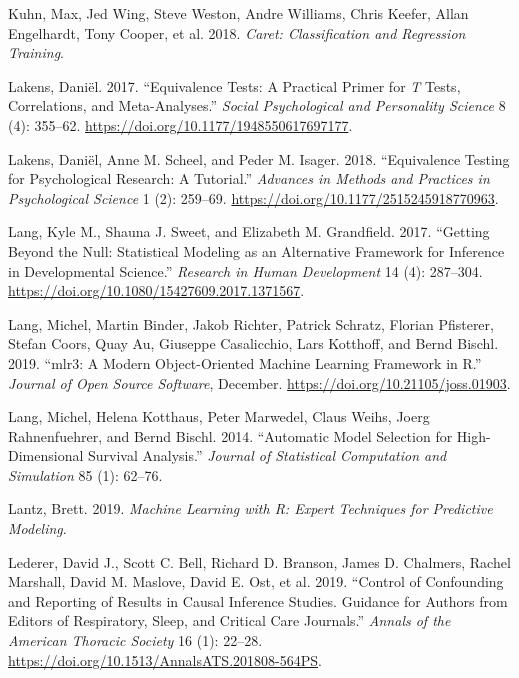 \documentclass[
]{book}
\newlength{\cslhangindent}
\newenvironment{cslreferences}%
  {\setlength{\parindent}{0pt}%
  \everypar{\setlength{\hangindent}{\cslhangindent}}\ignorespaces}%
  {\par}
\begin{document}
\begin{cslreferences}
\leavevmode\hypertarget{ref-kuhnCaretClassificationRegression2018}{}%
Kuhn, Max, Jed Wing, Steve Weston, Andre Williams, Chris Keefer, Allan Engelhardt, Tony Cooper, et al. 2018. \emph{Caret: Classification and Regression Training}.

\leavevmode\hypertarget{ref-lakensEquivalenceTestsPractical2017}{}%
Lakens, Daniël. 2017. ``Equivalence Tests: A Practical Primer for \emph{T} Tests, Correlations, and Meta-Analyses.'' \emph{Social Psychological and Personality Science} 8 (4): 355--62. \url{https://doi.org/10.1177/1948550617697177}.

\leavevmode\hypertarget{ref-lakensEquivalenceTestingPsychological2018}{}%
Lakens, Daniël, Anne M. Scheel, and Peder M. Isager. 2018. ``Equivalence Testing for Psychological Research: A Tutorial.'' \emph{Advances in Methods and Practices in Psychological Science} 1 (2): 259--69. \url{https://doi.org/10.1177/2515245918770963}.

\leavevmode\hypertarget{ref-langGettingNullStatistical2017}{}%
Lang, Kyle M., Shauna J. Sweet, and Elizabeth M. Grandfield. 2017. ``Getting Beyond the Null: Statistical Modeling as an Alternative Framework for Inference in Developmental Science.'' \emph{Research in Human Development} 14 (4): 287--304. \url{https://doi.org/10.1080/15427609.2017.1371567}.

\leavevmode\hypertarget{ref-R-mlr3}{}%
Lang, Michel, Martin Binder, Jakob Richter, Patrick Schratz, Florian Pfisterer, Stefan Coors, Quay Au, Giuseppe Casalicchio, Lars Kotthoff, and Bernd Bischl. 2019. ``mlr3: A Modern Object-Oriented Machine Learning Framework in R.'' \emph{Journal of Open Source Software}, December. \url{https://doi.org/10.21105/joss.01903}.

\leavevmode\hypertarget{ref-R-automatic}{}%
Lang, Michel, Helena Kotthaus, Peter Marwedel, Claus Weihs, Joerg Rahnenfuehrer, and Bernd Bischl. 2014. ``Automatic Model Selection for High-Dimensional Survival Analysis.'' \emph{Journal of Statistical Computation and Simulation} 85 (1): 62--76.

\leavevmode\hypertarget{ref-lantzMachineLearningExpert2019}{}%
Lantz, Brett. 2019. \emph{Machine Learning with R: Expert Techniques for Predictive Modeling}.

\leavevmode\hypertarget{ref-ledererControlConfoundingReporting2019}{}%
Lederer, David J., Scott C. Bell, Richard D. Branson, James D. Chalmers, Rachel Marshall, David M. Maslove, David E. Ost, et al. 2019. ``Control of Confounding and Reporting of Results in Causal Inference Studies. Guidance for Authors from Editors of Respiratory, Sleep, and Critical Care Journals.'' \emph{Annals of the American Thoracic Society} 16 (1): 22--28. \url{https://doi.org/10.1513/AnnalsATS.201808-564PS}.


\end{cslreferences}
\end{document}
